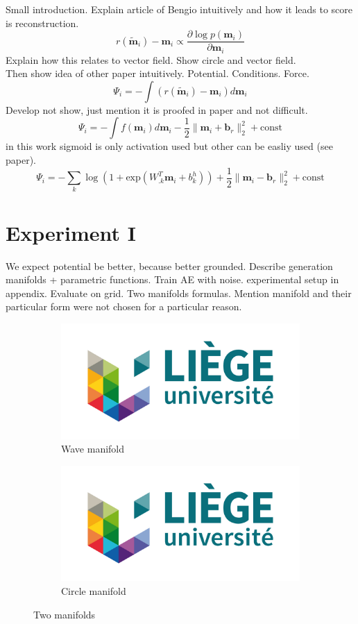 Small introduction. Explain article of Bengio intuitively and how it leads to score is reconstruction. 
$$ r(\tilde{\textbf{m}}_i) - \textbf{m}_i \propto \frac{\partial \log p(\textbf{m}_i)}{\partial \textbf{m}_i} $$ 
Explain how this relates to vector field. Show circle and vector field. \\
Then show idea of other paper intuitively. Potential. Conditions. Force.
$$\Psi_i = -\int (r(\tilde{\textbf{m}}_i) - \textbf{m}_i)d\textbf{m}_i$$
Develop not show, just mention it is proofed in paper and not difficult.
$$ \Psi_i = -\int f(\textbf{m}_i)d\textbf{m}_i - \frac{1}{2} \lVert \textbf{m}_i + \textbf{b}_r \rVert_2^2 + \text{const} $$
in this work sigmoid is only activation used but other can be easliy used (see paper).
$$ \Psi_i =  -\sum_k \log(1 + \text{exp}(W_{.k}^T \textbf{m}_i + b_k^h)) + \frac{1}{2} \lVert \textbf{m}_i - \textbf{b}_r \rVert_2^2 + \text{const}$$



\section{Experiment I}

We expect potential be better, because better grounded. 
Describe generation manifolds + parametric functions. Train AE with noise. experimental setup in appendix. Evaluate on grid. Two manifolds formulas. Mention manifold and their particular form were not chosen for a particular reason.
\begin{figure}[!h]
\centering
\begin{subfigure}{.5\textwidth}
  \centering
  \includegraphics[width=.4\linewidth]{figures/logo-uliege}
  \caption{Wave manifold}
  \label{fig:wave-manifold-only}
\end{subfigure}%
\begin{subfigure}{.5\textwidth}
  \centering
  \includegraphics[width=.4\linewidth]{figures/logo-uliege}
  \caption{Circle manifold}
  \label{fig:circle-manifold-only}
\end{subfigure}
\caption{Two manifolds}
\end{figure}

